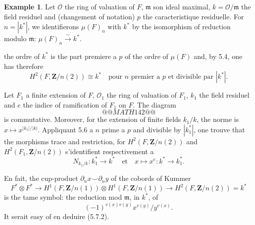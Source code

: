 \documentclass[11pt,a4paper]{article}
\theoremstyle{plain}
\theoremstyle{definition}
\newtheorem{example}[theorem]{Example}
\begin{document}
\begin{example}\label{5.7}
Let $\mathcal{O}$ the ring of valuation of $F$, $\mathfrak{m}$ son ideal maximal, $k = \mathcal{O}/\mathfrak{m}$ the field residuel and (changement of notation) $p$ the caracteristique residuelle. For $n = |k^*|$, we identifierons $\mu(F)_n$ with $k^*$ by the isomorphism of reduction modulo $\mathfrak{m}$: $\mu(F)_n \xrightarrow{\sim} k^*$.

the ordre of $k^*$ is the part premiere a $p$ of the ordre of $\mu(F)$ and, by 5.4, one has therefore
\begin{equation}\label{5.7.1}
H^2(F, \mathbf{Z}/n(2)) \cong k^* \quad \text{pour } n \text{ premier a } p \text{ et divisible par } |k^*|.
\end{equation}

Let $F_1$ a finite extension of $F$, $\mathcal{O}_1$ the ring of valuation of $F_1$, $k_1$ the field residuel and $e$ the indice of ramification of $F_1$ on $F$. The diagram
\[
@@MATH142@@
\]
is commutative. Moreover, for the extension of finite fields $k_1/k$, the norme is $x \mapsto x^{|k_1|/|k|}$. Appliquant 5.6 a $n$ prime a $p$ and divisible by $|k_1^*|$, one trouve that the morphisms trace and restriction, for $H^2(F, \mathbf{Z}/n(2))$ and $H^2(F_1, \mathbf{Z}/n(2))$ s'identifient respectivement a
\begin{equation}\label{5.7.2}
N_{k_1/k} : k_1^* \to k^* \quad \text{et} \quad x \mapsto x^e : k^* \to k_1^*.
\end{equation}

En fait, the cup-product $\partial_n x \smile \partial_n y$ of the cobords of Kummer
\[
F^* \otimes F^* \to H^1(F, \mathbf{Z}/n(1)) \otimes H^1(F, \mathbf{Z}/n(1)) \to H^2(F, \mathbf{Z}/n(2)) = k^*
\]
is the tame symbol: the reduction mod $\mathfrak{m}$, in $k^*$, of
\[
(-1)^{v(x) v(y)} x^{v(y)} / y^{v(x)}.
\]
It serait easy of en deduire (5.7.2).
\end{example}
\end{document}
